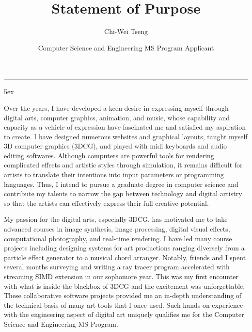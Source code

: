 \documentclass[a4paper, 11pt]{article}
\title{Statement of Purpose}
\author{Chi-Wei Tseng}
\date{Computer Science and Engineering MS Program Applicant}
\makeatletter
\newcommand{\HRule}{\rule{\linewidth}{0.2mm}}
\renewcommand{\maketitle}{
  \parindent=0pt%
  \begin{flushleft}
  \bf \large{\@author} \hfill {\small \@date}
  \HRule
  \end{flushleft}
  \begin{center}
    \MakeUppercase{\bf \@title}
  \end{center}%
    \par
}
\makeatother
\begin{document}
{\large
{\linespread{0.8} \maketitle}
\parindent 5ex
}

Over the years, I have developed a keen desire in expressing myself through digital arts, computer graphics, animation, and music, whose capability and capacity as a vehicle of expression have fascinated me and satisfied my aspiration to create. I have designed numerous websites and graphical layouts, taught myself 3D computer graphics (3DCG), and played with midi keyboards and audio editing softwares. Although computers are powerful tools for rendering complicated effects and artistic styles through simulation, it remains difficult for artists to translate their intentions into input parameters or programming languages. Thus, I intend to pursue a graduate degree in computer science and contribute my talents to narrow the gap between technology and digital artistry so that the artists can effectively express their full creative potential.


My passion for the digital arts, especially 3DCG, has motivated me to take advanced courses in image synthesis, image processing, digital visual effects, computational photography, and real-time rendering. I have led many course projects including designing systems for art productions ranging diversely from a particle effect generator to a musical chord arranger. Notably, friends and I spent several months surveying and writing a ray tracer program accelerated with streaming SIMD extension in our sophomore year. This was my first encounter with what is inside the blackbox of 3DCG and the excitement was unforgettable. These collaborative software projects provided me an in-depth understanding of the technical basis of many art tools that I once used. Such hands-on experience with the engineering aspect of digital art uniquely qualifies me for the Computer Science and Engineering MS Program.
\end{document}
